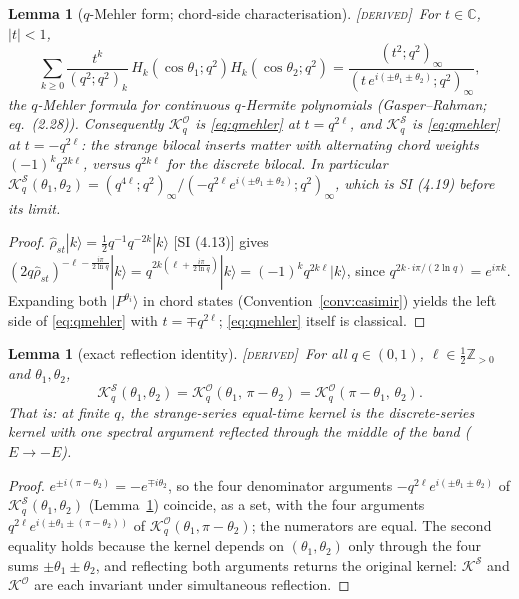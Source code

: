 \documentclass[11pt,a4paper]{article}
\newcommand{\DERIVED}{{\color{teal}\textsc{[derived]}}}
\theoremstyle{definition}
\theoremstyle{plain}
\newtheorem{lemma}[definition]{Lemma}
\newcommand{\Z}{\mathbb{Z}}
\newcommand{\C}{\mathbb{C}}
\newcommand{\ket}[1]{|#1\rangle}
\renewcommand{\P}{P}                            %
\renewcommand{\O}{\mathcal{O}}                  %
\newcommand{\K}{\mathcal{K}}                    %
\begin{document}
\begin{lemma}[$q$-Mehler form; chord-side characterisation]\label{lem:mehler}
\DERIVED\ For $t\in\C$, $|t|<1$,
\begin{equation}\label{eq:qmehler}
  \sum_{k\ge0}\frac{t^{k}}{(q^{2};q^{2})_{k}}\,H_{k}(\cos\theta_1;q^{2})H_{k}(\cos\theta_2;q^{2})
  =\frac{(t^{2};q^{2})_{\infty}}{(t\,e^{i(\pm\theta_1\pm\theta_2)};q^{2})_{\infty}},
\end{equation}
the $q$-Mehler formula for continuous $q$-Hermite polynomials
(Gasper--Rahman; \cite{Berkooz:2018largeN} eq.\ (2.28)). Consequently
$\K^{\O}_{q}$ is \eqref{eq:qmehler} at $t=q^{2\ell}$, and
$\K^{\mathcal{S}}_{q}$ is \eqref{eq:qmehler} at $t=-q^{2\ell}$:
the strange bilocal inserts matter with \emph{alternating chord weights}
$(-1)^{k}q^{2k\ell}$, versus $q^{2k\ell}$ for the discrete bilocal. In particular
$\K^{\mathcal{S}}_{q}(\theta_1,\theta_2)
=(q^{4\ell};q^{2})_{\infty}/(-q^{2\ell}e^{i(\pm\theta_1\pm\theta_2)};q^{2})_{\infty}$,
which is SI (4.19) before its limit.
\end{lemma}

\begin{proof}
$\hat\rho_{st}\ket{k}=\tfrac12 q^{-1}q^{-2k}\ket{k}$ [SI (4.13)] gives
$(2q\hat\rho_{st})^{-\ell-\frac{i\pi}{2\ln q}}\ket{k}
=q^{2k(\ell+\frac{i\pi}{2\ln q})}\ket{k}=(-1)^{k}q^{2k\ell}\ket{k}$, since
$q^{2k\cdot i\pi/(2\ln q)}=e^{i\pi k}$. Expanding both $\ket{\P^{\theta_i}}$ in chord states
(Convention~\ref{conv:casimir}) yields the left side of \eqref{eq:qmehler} with $t=\mp q^{2\ell}$;
\eqref{eq:qmehler} itself is classical.
\end{proof}

\begin{lemma}[exact reflection identity]\label{lem:reflection}
\DERIVED\ For all $q\in(0,1)$, $\ell\in\tfrac12\Z_{>0}$ and $\theta_{1},\theta_{2}$,
\begin{equation}\label{eq:reflection}
  \K^{\mathcal{S}}_{q}(\theta_{1},\theta_{2})
  =\K^{\O}_{q}(\theta_{1},\,\pi-\theta_{2})
  =\K^{\O}_{q}(\pi-\theta_{1},\,\theta_{2}).
\end{equation}
That is: at finite $q$, the strange-series equal-time kernel is the discrete-series kernel with
one spectral argument reflected through the middle of the band ($E\to-E$).
\end{lemma}

\begin{proof}
$e^{\pm i(\pi-\theta_2)}=-e^{\mp i\theta_2}$, so the four denominator arguments
$-q^{2\ell}e^{i(\pm\theta_1\pm\theta_2)}$ of $\K^{\mathcal{S}}_{q}(\theta_1,\theta_2)$
(Lemma~\ref{lem:mehler}) coincide, as a set, with the four arguments
$q^{2\ell}e^{i(\pm\theta_1\pm(\pi-\theta_2))}$ of
$\K^{\O}_{q}(\theta_1,\pi-\theta_2)$; the numerators are equal. The second equality holds because
the kernel depends on $(\theta_1,\theta_2)$ only through the four sums $\pm\theta_1\pm\theta_2$,
and reflecting both arguments returns the original kernel:
$\K^{\mathcal{S}}$ and $\K^{\O}$ are each invariant under simultaneous reflection.
\end{proof}
\end{document}
